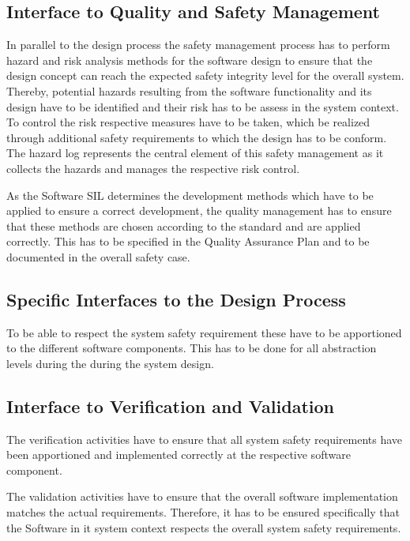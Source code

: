 \documentclass{template/openetcs_report}
\begin{document}
\subsection{Interface to Quality and Safety Management}

In parallel to the design process the safety management process has to perform hazard and risk analysis methods for the software design to ensure that the design concept can reach the expected safety integrity level for the overall system. Thereby, potential hazards resulting from the software functionality and its design have to be identified and their risk has to be assess in the system context. To control the risk respective measures have to be taken, which be realized through additional safety requirements to which the design has to be conform. The hazard log represents the central element of this safety management as it collects the hazards and manages the respective risk control.

As the Software SIL determines the development methods which have to be applied to ensure a correct development, the quality management has to ensure that these methods are chosen according to the standard and are applied correctly. This has to be specified in the Quality Assurance Plan and to be documented in the overall safety case. 

\subsection{Specific Interfaces to the Design Process}

To be able to respect the system safety requirement these have to be apportioned to the different software components. This has to be done for all abstraction levels during the during the system design. 

\subsection{Interface to Verification and Validation}

The verification activities have to ensure that all system safety requirements have been apportioned and implemented correctly at the respective software component.

The validation activities have to ensure that the overall software implementation matches the actual requirements. Therefore, it has to be ensured specifically that the Software in it system context respects the overall system safety requirements.
\end{document}
